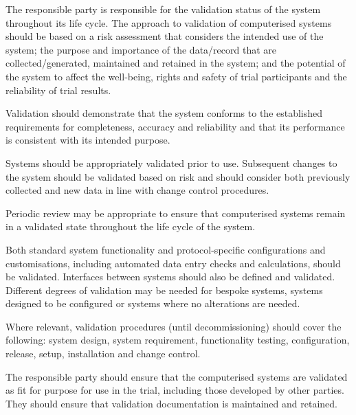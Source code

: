\documentclass[11pt]{article}
\begin{document}
\begin{description}[leftmargin=2.5cm,style=sameline]

\item[(a)] The responsible party is responsible for the validation status of the system throughout its life cycle. The approach to validation of computerised systems should be based on a risk assessment that considers the intended use of the system; the purpose and importance of the data/record that are collected/generated, maintained and retained in the system; and the potential of the system to affect the well-being, rights and safety of trial participants and the reliability of trial results.

\item[(b)] Validation should demonstrate that the system conforms to the established requirements for completeness, accuracy and reliability and that its performance is consistent with its intended purpose.

\item[(c)] Systems should be appropriately validated prior to use. Subsequent changes to the system should be validated based on risk and should consider both previously collected and new data in line with change control procedures.

\item[(d)] Periodic review may be appropriate to ensure that computerised systems remain in a validated state throughout the life cycle of the system.

\item[(e)] Both standard system functionality and protocol-specific configurations and customisations, including automated data entry checks and calculations, should be validated. Interfaces between systems should also be defined and validated. Different degrees of validation may be needed for bespoke systems, systems designed to be configured or systems where no alterations are needed.

\item[(f)] Where relevant, validation procedures (until decommissioning) should cover the following: system design, system requirement, functionality testing, configuration, release, setup, installation and change control.

\item[(g)] The responsible party should ensure that the computerised systems are validated as fit for purpose for use in the trial, including those developed by other parties. They should ensure that validation documentation is maintained and retained.


\end{description}
\end{document}
